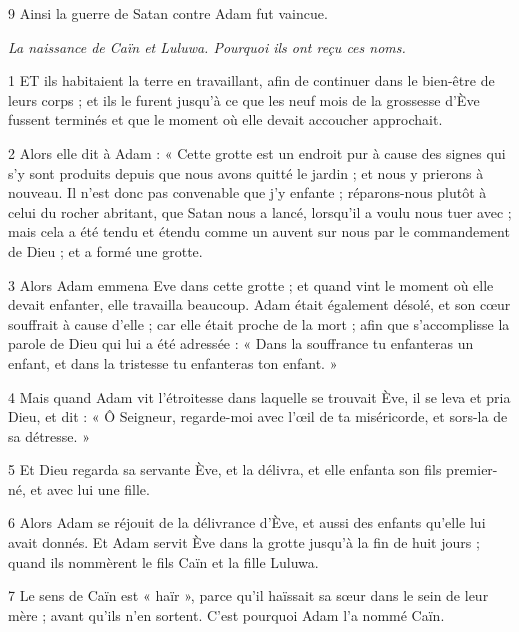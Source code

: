 \par 9 Ainsi la guerre de Satan contre Adam fut vaincue.




\par \textit{La naissance de Caïn et Luluwa. Pourquoi ils ont reçu ces noms.}

\par 1 ET ils habitaient la terre en travaillant, afin de continuer dans le bien-être de leurs corps ; et ils le furent jusqu'à ce que les neuf mois de la grossesse d'Ève fussent terminés et que le moment où elle devait accoucher approchait.

\par 2 Alors elle dit à Adam : « Cette grotte est un endroit pur à cause des signes qui s'y sont produits depuis que nous avons quitté le jardin ; et nous y prierons à nouveau. Il n’est donc pas convenable que j’y enfante ; réparons-nous plutôt à celui du rocher abritant, que Satan nous a lancé, lorsqu'il a voulu nous tuer avec ; mais cela a été tendu et étendu comme un auvent sur nous par le commandement de Dieu ; et a formé une grotte.

\par 3 Alors Adam emmena Eve dans cette grotte ; et quand vint le moment où elle devait enfanter, elle travailla beaucoup. Adam était également désolé, et son cœur souffrait à cause d'elle ; car elle était proche de la mort ; afin que s'accomplisse la parole de Dieu qui lui a été adressée : « Dans la souffrance tu enfanteras un enfant, et dans la tristesse tu enfanteras ton enfant. »

\par 4 Mais quand Adam vit l'étroitesse dans laquelle se trouvait Ève, il se leva et pria Dieu, et dit : « Ô Seigneur, regarde-moi avec l'œil de ta miséricorde, et sors-la de sa détresse. »

\par 5 Et Dieu regarda sa servante Ève, et la délivra, et elle enfanta son fils premier-né, et avec lui une fille.

\par 6 Alors Adam se réjouit de la délivrance d'Ève, et aussi des enfants qu'elle lui avait donnés. Et Adam servit Ève dans la grotte jusqu'à la fin de huit jours ; quand ils nommèrent le fils Caïn et la fille Luluwa.

\par 7 Le sens de Caïn est « haïr », parce qu'il haïssait sa sœur dans le sein de leur mère ; avant qu’ils n’en sortent. C’est pourquoi Adam l’a nommé Caïn.

